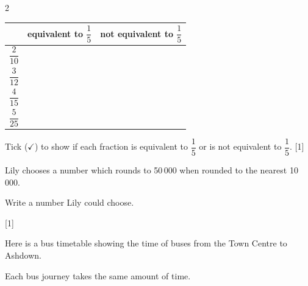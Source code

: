 \documentclass[12pt]{article}
\newcommand{\QuestionMarks}[1]{\hfill [#1]}
\newcommand{\AnswerLine}[1]{\makebox[#1]{\hrulefill}}
\newcommand{\BoxedQuestionLabel}[1]{%
	\begingroup
	\setlength{\fboxsep}{0pt}%
	\raisebox{-0.12cm}{%
		\fbox{%
			\makebox[0.68cm][c]{\rule[-0.18cm]{0pt}{0.68cm}\textbf{#1}}%
		}%
	}%
	\endgroup
}
\begin{document}
\begin{multicols}{2}
\begin{enumerate}[
			label=\BoxedQuestionLabel{\arabic*},
			leftmargin=1.1cm,
			labelwidth=0.72cm,
			labelsep=0.25cm,
			itemsep=0pt,
			topsep=0pt,
			parsep=0pt
			]
			\begin{center}
				\begin{tabular}{|>{\centering\arraybackslash}p{1.75cm}|>{\centering\arraybackslash}p{2.25cm}|>{\centering\arraybackslash}p{2.55cm}|}
					\cline{2-3}
					\multicolumn{1}{c|}{} &
					\textbf{equivalent to \(\dfrac{1}{5}\)} &
					\textbf{not equivalent to \(\dfrac{1}{5}\)} \\
					\hline
					\(\dfrac{2}{10}\) & \rule{0pt}{0.9cm} & \\
					\hline
					\(\dfrac{3}{12}\) & \rule{0pt}{0.9cm} & \\
					\hline
					\(\dfrac{4}{15}\) & \rule{0pt}{0.9cm} & \\
					\hline
					\(\dfrac{5}{25}\) & \rule{0pt}{0.9cm} & \\
					\hline
				\end{tabular}
			\end{center}
			
			\vspace{0.35cm}
			
			Tick (\(\checkmark\)) to show if each fraction is equivalent to \(\dfrac{1}{5}\)
			or is not equivalent to \(\dfrac{1}{5}\). \QuestionMarks{1}
			
			\vspace{0.95cm}
			
			\item
			Lily chooses a number which rounds to 50\,000 when rounded to the nearest 10\,000.
			
			\vspace{0.45cm}
			
			Write a number Lily could choose.
			
			\vspace{0.8cm}
			
			\hfill \AnswerLine{4.2cm} \QuestionMarks{1}
			
			\vspace{0.8cm}
			
			\item
			Here is a bus timetable showing the time of buses from the Town Centre to Ashdown.
			
			\vspace{0.3cm}
			
			Each bus journey takes the same amount of time.
			
			\vspace{0.35cm}
			

\end{enumerate}
\end{multicols}
\end{document}
